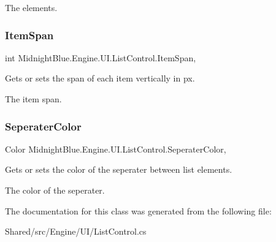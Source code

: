 The elements.\hypertarget{class_midnight_blue_1_1_engine_1_1_u_i_1_1_list_control_ac649c09e8fb1d6ffb6760f80deecfd8f}{}\label{class_midnight_blue_1_1_engine_1_1_u_i_1_1_list_control_ac649c09e8fb1d6ffb6760f80deecfd8f} 
\subsubsection{\texorpdfstring{Item\+Span}{ItemSpan}}
{\footnotesize\ttfamily int Midnight\+Blue.\+Engine.\+U\+I.\+List\+Control.\+Item\+Span\hspace{0.3cm}{\ttfamily [get]}, {\ttfamily [set]}}



Gets or sets the span of each item vertically in px. 

The item span.\hypertarget{class_midnight_blue_1_1_engine_1_1_u_i_1_1_list_control_a8e7ece86f6bab1d06429001edd6d23e5}{}\label{class_midnight_blue_1_1_engine_1_1_u_i_1_1_list_control_a8e7ece86f6bab1d06429001edd6d23e5} 
\subsubsection{\texorpdfstring{Seperater\+Color}{SeperaterColor}}
{\footnotesize\ttfamily Color Midnight\+Blue.\+Engine.\+U\+I.\+List\+Control.\+Seperater\+Color\hspace{0.3cm}{\ttfamily [get]}, {\ttfamily [set]}}



Gets or sets the color of the seperater between list elements. 

The color of the seperater.

The documentation for this class was generated from the following file\+:\begin{DoxyCompactItemize}
\item 
Shared/src/\+Engine/\+U\+I/List\+Control.\+cs\end{DoxyCompactItemize}
